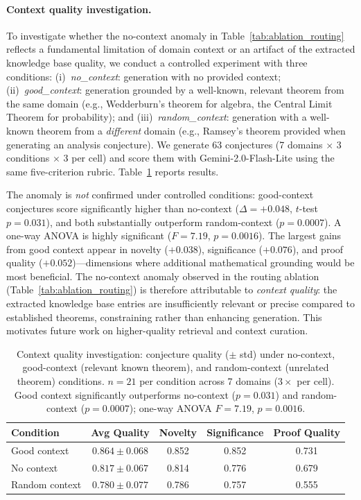 \documentclass[11pt,a4paper]{article}
\begin{document}
\paragraph{Context quality investigation.}
To investigate whether the no-context anomaly in Table~\ref{tab:ablation_routing} reflects a fundamental limitation of domain context or an artifact of the extracted knowledge base quality, we conduct a controlled experiment with three conditions: (i)~\emph{no\_context}: generation with no provided context; (ii)~\emph{good\_context}: generation grounded by a well-known, relevant theorem from the same domain (e.g., Wedderburn's theorem for algebra, the Central Limit Theorem for probability); and (iii)~\emph{random\_context}: generation with a well-known theorem from a \emph{different} domain (e.g., Ramsey's theorem provided when generating an analysis conjecture). We generate 63 conjectures (7 domains $\times$ 3 conditions $\times$ 3 per cell) and score them with Gemini-2.0-Flash-Lite using the same five-criterion rubric. Table~\ref{tab:context_investigation} reports results.

The anomaly is \emph{not} confirmed under controlled conditions: good-context conjectures score significantly higher than no-context ($\Delta = +0.048$, $t$-test $p = 0.031$), and both substantially outperform random-context ($p = 0.0007$). A one-way ANOVA is highly significant ($F = 7.19$, $p = 0.0016$). The largest gains from good context appear in novelty ($+0.038$), significance ($+0.076$), and proof quality ($+0.052$)---dimensions where additional mathematical grounding would be most beneficial. The no-context anomaly observed in the routing ablation (Table~\ref{tab:ablation_routing}) is therefore attributable to \emph{context quality}: the extracted knowledge base entries are insufficiently relevant or precise compared to established theorems, constraining rather than enhancing generation. This motivates future work on higher-quality retrieval and context curation.

\begin{table}[h]
\centering
\caption{Context quality investigation: conjecture quality ($\pm$ std) under no-context, good-context (relevant known theorem), and random-context (unrelated theorem) conditions. $n{=}21$ per condition across 7 domains ($3{\times}$ per cell). Good context significantly outperforms no-context ($p{=}0.031$) and random-context ($p{=}0.0007$); one-way ANOVA $F{=}7.19$, $p{=}0.0016$.}
\label{tab:context_investigation}
\small
\begin{tabular}{@{}lcccc@{}}
\toprule
\textbf{Condition} & \textbf{Avg Quality} & \textbf{Novelty} & \textbf{Significance} & \textbf{Proof Quality} \\
\midrule
Good context   & $0.864 \pm 0.068$ & 0.852 & 0.852 & 0.731 \\
No context     & $0.817 \pm 0.067$ & 0.814 & 0.776 & 0.679 \\
Random context & $0.780 \pm 0.077$ & 0.786 & 0.757 & 0.555 \\
\bottomrule
\end{tabular}
\end{table}
\end{document}
